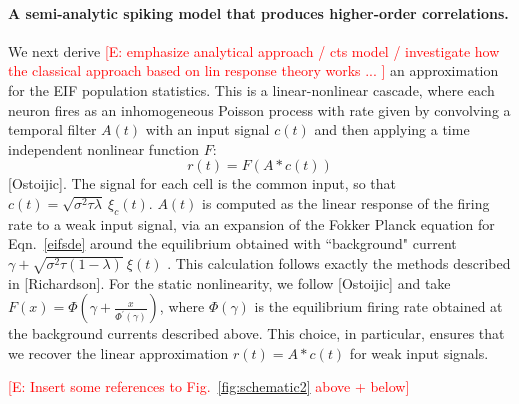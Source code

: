 \documentclass[%
 reprint,
 amsmath,amssymb,
 aps,
floatfix,
]{revtex4-1}
\newcommand{\Ecomment}[1]{\textcolor{red}{[E: #1]}}
\begin{document}
\paragraph*{A semi-analytic spiking model that produces higher-order correlations.}  We next derive \Ecomment{emphasize analytical approach / cts model / investigate how the classical approach based on lin response theory works ... } an approximation for the EIF population statistics.  This is a linear-nonlinear cascade, where each neuron fires as an inhomogeneous Poisson process with rate given by convolving a temporal filter $A(t)$ with an input signal $c(t)$ and then applying a time independent nonlinear function $F$:   
\begin{equation}
r(t) = F\left(A * c(t) \right) \nonumber
\end{equation}
[Ostoijic].  The signal for each cell is the common input, so that $c(t) = \sqrt{\sigma^2 \tau \lambda}~\xi_c(t)$.  $A(t)$ is computed as the linear response of the firing rate to a weak input signal, via an expansion of the Fokker Planck equation for Eqn.~\eqref{eifsde} around the equilibrium obtained with ``background" current $\gamma+ \sqrt{\sigma^2 \tau (1-\lambda)}~\xi(t)$ .  This calculation follows exactly the methods described in [Richardson].  For the static nonlinearity, we follow [Ostoijic] and take $F(x) = \Phi\left( \gamma + \frac{x}{\Phi^\prime(\gamma)}\right)$, where $\Phi\left( \gamma \right)$ is the equilibrium firing rate obtained at the background currents described above.  This choice, in particular, ensures that we recover the linear approximation $r(t) = A * c(t)$ for weak input signals.

\Ecomment{Insert some references to Fig.~\ref{fig:schematic2} above + below}
\end{document}
